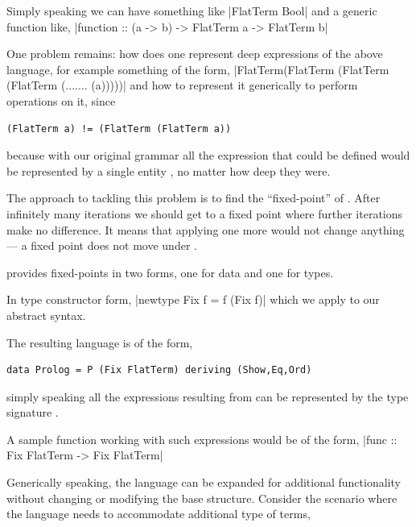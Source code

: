\documentclass[thesis-solanki.tex]{subfiles}
\begin{document}
Simply speaking we can have something like
|FlatTerm Bool|
and a generic function like,
|function :: (a -> b) -> FlatTerm a -> FlatTerm b|

One problem remains: how does one represent deep expressions
of the above language, 
for example something of the form,
|FlatTerm(FlatTerm (FlatTerm (FlatTerm (....... (a)))))|
and how to represent it generically to perform operations on it, since
\begin{verbatim}
(FlatTerm a) != (FlatTerm (FlatTerm a))
\end{verbatim}
%
because with our original grammar all the expression that could be defined would be represented by a single entity
, no matter how deep they were.

The approach to tackling this problem is to find the ``fixed-point'' of .
After infinitely many iterations we should get to a fixed point where further iterations make no
difference.
It means that applying one more  would not change anything---%
a fix{\Large ed} point does not move under .

 provides fixed-points in two forms, one for data and one for types.

In type constructor form,
|newtype Fix f = f (Fix f)|
which we apply to our abstract syntax.


The resulting language is of the form,
\begin{verbatim}
data Prolog = P (Fix FlatTerm) deriving (Show,Eq,Ord)
\end{verbatim}
%
simply speaking all the expressions resulting from  can be represented  by the type signature .

A sample function working with such expressions would be of the form,
|func :: Fix FlatTerm -> Fix FlatTerm|


Generically speaking, the language can be expanded for additional functionality without changing or modifying the
base structure.
Consider the scenario where the language needs to accommodate additional type of terms,
\end{document}
